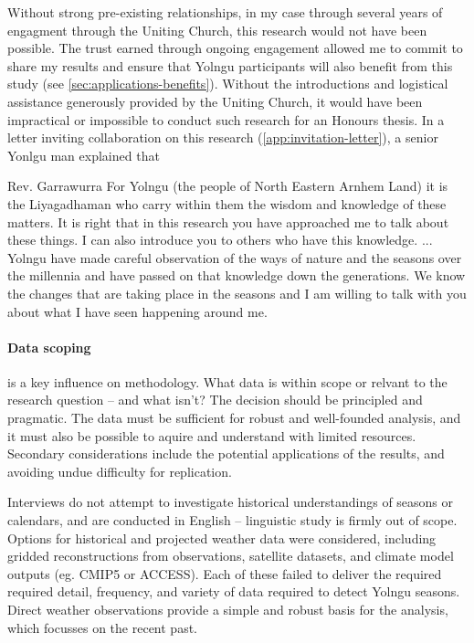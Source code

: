 Without strong pre-existing relationships, in my case through several
years of engagment through the Uniting Church, this research would not
have been possible.  The trust earned through ongoing engagement allowed
me to commit to share my results and ensure that Yolngu participants will
also benefit from this study (see \cref{sec:applications-benefits}).  Without the introductions and logistical
assistance generously provided by the Uniting Church, it would have been impractical or
impossible to conduct such research for an Honours thesis.
%
In a letter inviting collaboration on this research (\cref{app:invitation-letter}),
a senior Yonlgu man explained that
\begin{pquote}{Rev. Garrawurra}
    For Yolngu (the people of North Eastern Arnhem Land) it is the Liyagadhaman
    who carry within them the wisdom and knowledge of these matters.
    It is right that in this research you have approached me to talk about these
    things. I can also introduce you to others who have this knowledge.
    ...
    Yolngu have made careful observation of the ways of nature and the seasons
    over the millennia and have passed on that knowledge down the generations.
    We know the changes that are taking place in the seasons and I am willing
    to talk with you about what I have seen happening around me.
\end{pquote}


\paragraph{Data scoping} is a key influence on methodology.
What data is within scope or relvant to the research question --
and what isn't?
%
The decision should be principled and pragmatic.
The data must be sufficient for robust and well-founded analysis,
and it must also be possible to aquire and understand with limited
resources.  Secondary considerations include the potential applications
of the results, and avoiding undue difficulty for replication.

Interviews do not attempt to investigate historical understandings of
seasons or calendars, and are conducted in English -- linguistic study
is firmly out of scope.
%
Options for historical and projected weather data were considered, including
gridded reconstructions from observations, satellite datasets, and climate
model outputs (eg. CMIP5 or ACCESS).  Each of these failed to deliver the
required required detail, frequency, and variety of data required to detect
Yolngu seasons.  Direct weather observations provide a simple and robust basis
for the analysis, which focusses on the recent past.

